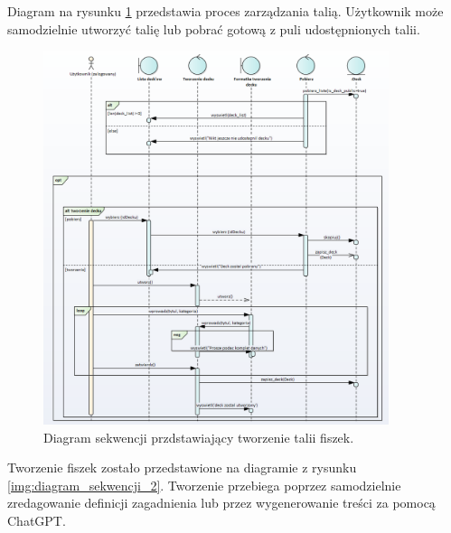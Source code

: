 \indent Diagram na rysunku \ref{img:diagram_sekwencji_1} przedstawia proces zarządzania talią. Użytkownik może samodzielnie utworzyć talię lub pobrać gotową z puli udostępnionych talii.
\begin{figure}[H]
    \centering
    \includegraphics[width=0.9\textwidth]{chapters/chapter_6/diagram_sekwencji_1}
    \caption{Diagram sekwencji przdstawiający tworzenie talii fiszek.}
    \label{img:diagram_sekwencji_1}
\end{figure}


\indent Tworzenie fiszek zostało przedstawione na diagramie z rysunku \ref{img:diagram_sekwencji_2}. Tworzenie przebiega poprzez samodzielnie zredagowanie definicji zagadnienia lub przez wygenerowanie treści za pomocą ChatGPT.


